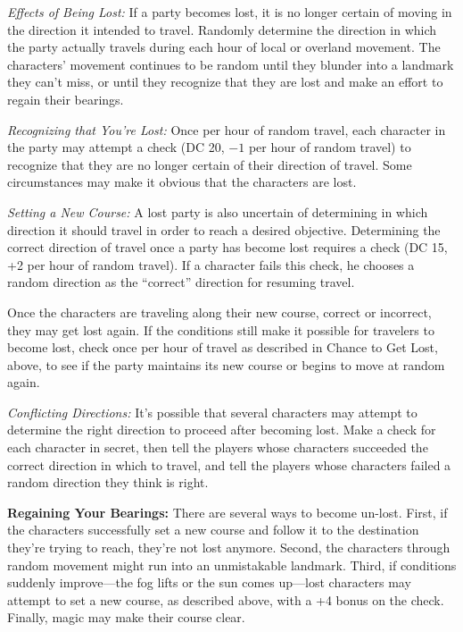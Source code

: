 \textit{Effects of Being Lost:} If a party becomes lost, it is no longer certain of moving in the direction it intended to travel. Randomly determine the direction in which the party actually travels during each hour of local or overland movement. The characters' movement continues to be random until they blunder into a landmark they can't miss, or until they recognize that they are lost and make an effort to regain their bearings.

\textit{Recognizing that You're Lost:} Once per hour of random travel, each character in the party may attempt a  check (DC 20, $-1$ per hour of random travel) to recognize that they are no longer certain of their direction of travel. Some circumstances may make it obvious that the characters are lost.

\textit{Setting a New Course:} A lost party is also uncertain of determining in which direction it should travel in order to reach a desired objective. Determining the correct direction of travel once a party has become lost requires a  check (DC 15, +2 per hour of random travel). If a character fails this check, he chooses a random direction as the ``correct'' direction for resuming travel.

Once the characters are traveling along their new course, correct or incorrect, they may get lost again. If the conditions still make it possible for travelers to become lost, check once per hour of travel as described in Chance to Get Lost, above, to see if the party maintains its new course or begins to move at random again.

\textit{Conflicting Directions:} It's possible that several characters may attempt to determine the right direction to proceed after becoming lost. Make a  check for each character in secret, then tell the players whose characters succeeded the correct direction in which to travel, and tell the players whose characters failed a random direction they think is right.

\textbf{Regaining Your Bearings:} There are several ways to become un-lost. First, if the characters successfully set a new course and follow it to the destination they're trying to reach, they're not lost anymore. Second, the characters through random movement might run into an unmistakable landmark. Third, if conditions suddenly improve---the fog lifts or the sun comes up---lost characters may attempt to set a new course, as described above, with a +4 bonus on the  check. Finally, magic may make their course clear.
